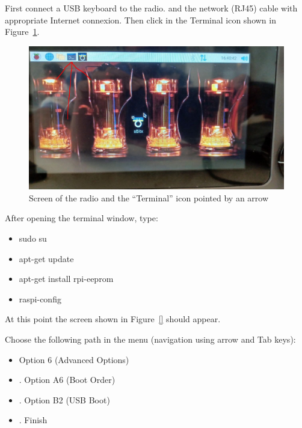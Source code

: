 \documentclass[11pt,a4paper]{article}
\begin{document}
First connect a USB keyboard to the radio. and the network (RJ45) cable with appropriate Internet connexion.
Then click in the Terminal icon shown in Figure~\ref{fig:terminal}.

\begin{figure}[!ht]
\includegraphics[width=1\textwidth]{pictures/screen1-edited.jpeg}
\caption{Screen of the radio and the ``Terminal'' icon pointed by an arrow}
\label{fig:terminal}
\end{figure}

After opening the terminal window, type:

\begin{itemize}
\item sudo su
\item apt-get update
\item apt-get install rpi-eeprom
\item raspi-config
\end{itemize}

At this point the screen shown in Figure~\ref{} should appear.

Choose the following path in the menu (navigation using arrow and Tab keys):
\begin{itemize}
\item Option 6 (Advanced Options)
\item . Option A6 (Boot Order)
\item . Option B2 (USB Boot)
\item . Finish
\end{itemize}




\end{document}
